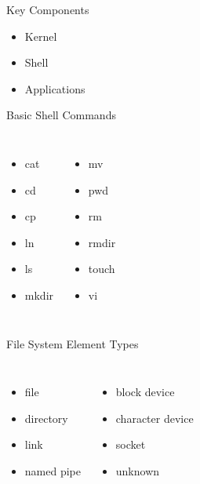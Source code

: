 \documentclass[compress]{beamer}
\begin{document}
\begin{slide}
	\begin{block}{Key Components}

	\begin{itemize}
	\item[] Kernel
	\item[] Shell
	\item[] Applications
	\end{itemize}

	\end{block}
\end{slide}

\begin{slide}
	\begin{block}{Basic Shell Commands}

	\begin{columns}
		\begin{itemize}
		\item[] cat
		\item[] cd
		\item[] cp
		\item[] ln
		\item[] ls
		\item[] mkdir
		\end{itemize}
		\begin{itemize}
		\item[] mv
		\item[] pwd
		\item[] rm
		\item[] rmdir
		\item[] touch
		\item[] vi
		\end{itemize}
	\end{columns}

	\end{block}
\end{slide}

\begin{slide}
	\begin{block}{File System Element Types}

	\begin{columns}
	\column{0.5\textwidth}
		\begin{itemize}
		\item[] file
		\item[] directory
		\item[] link
		\item[] named pipe
		\end{itemize}
	\column{0.5\textwidth}
		\begin{itemize}
		\item[] block device
		\item[] character device
		\item[] socket
		\item[] unknown
		\end{itemize}
	\end{columns}

	\end{block}
\end{slide}
\end{document}
